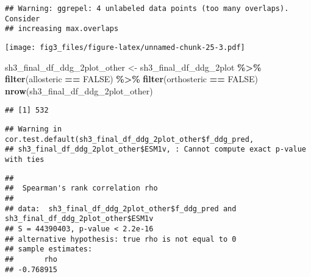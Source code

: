 \documentclass[
]{article}
\newenvironment{Shaded}{\begin{snugshade}}{\end{snugshade}}
\newcommand{\AttributeTok}[1]{\textcolor[rgb]{0.13,0.29,0.53}{#1}}
\newcommand{\CommentTok}[1]{\textcolor[rgb]{0.56,0.35,0.01}{\textit{#1}}}
\newcommand{\ConstantTok}[1]{\textcolor[rgb]{0.56,0.35,0.01}{#1}}
\newcommand{\FunctionTok}[1]{\textcolor[rgb]{0.13,0.29,0.53}{\textbf{#1}}}
\newcommand{\NormalTok}[1]{#1}
\newcommand{\OtherTok}[1]{\textcolor[rgb]{0.56,0.35,0.01}{#1}}
\newcommand{\SpecialCharTok}[1]{\textcolor[rgb]{0.81,0.36,0.00}{\textbf{#1}}}
\newcommand{\StringTok}[1]{\textcolor[rgb]{0.31,0.60,0.02}{#1}}
\begin{document}
\begin{verbatim}
## Warning: ggrepel: 4 unlabeled data points (too many overlaps). Consider
## increasing max.overlaps
\end{verbatim}

\texttt{[image: fig3\_files/figure-latex/unnamed-chunk-25-3.pdf]}

\begin{Shaded}
\begin{Highlighting}[]
\NormalTok{sh3\_final\_df\_ddg\_2plot\_other }\OtherTok{\textless{}{-}}\NormalTok{ sh3\_final\_df\_ddg\_2plot }\SpecialCharTok{\%\textgreater{}\%} \FunctionTok{filter}\NormalTok{(allosteric }\SpecialCharTok{==} \ConstantTok{FALSE}\NormalTok{) }\SpecialCharTok{\%\textgreater{}\%} \FunctionTok{filter}\NormalTok{(orthosteric }\SpecialCharTok{==} \ConstantTok{FALSE}\NormalTok{)}
\FunctionTok{nrow}\NormalTok{(sh3\_final\_df\_ddg\_2plot\_other)}
\end{Highlighting}
\end{Shaded}

\begin{verbatim}
## [1] 532
\end{verbatim}

\begin{Shaded}
\end{Shaded}

\begin{verbatim}
## Warning in cor.test.default(sh3_final_df_ddg_2plot_other$f_ddg_pred,
## sh3_final_df_ddg_2plot_other$ESM1v, : Cannot compute exact p-value with ties
\end{verbatim}

\begin{verbatim}
## 
##  Spearman's rank correlation rho
## 
## data:  sh3_final_df_ddg_2plot_other$f_ddg_pred and sh3_final_df_ddg_2plot_other$ESM1v
## S = 44390403, p-value < 2.2e-16
## alternative hypothesis: true rho is not equal to 0
## sample estimates:
##       rho 
## -0.768915
\end{verbatim}
\end{document}

